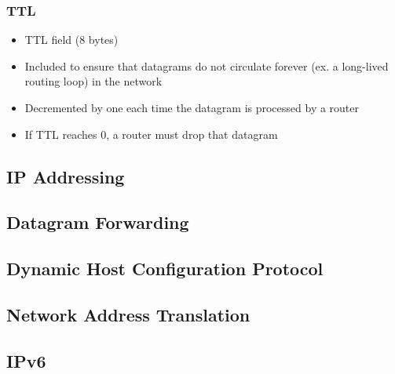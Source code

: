 \subsubsection{TTL}
\begin{itemize}
	\item TTL field (8 bytes)
	\item Included to ensure that datagrams do not circulate forever (ex. a long-lived routing loop) in the network
	\item Decremented by one each time the datagram is processed by a router
	\item If TTL reaches 0, a router must drop that datagram
\end{itemize}

\subsection{IP Addressing}

\newpage
\subsection{Datagram Forwarding}

\subsection{Dynamic Host Configuration Protocol}

\subsection{Network Address Translation}

\subsection{IPv6}
